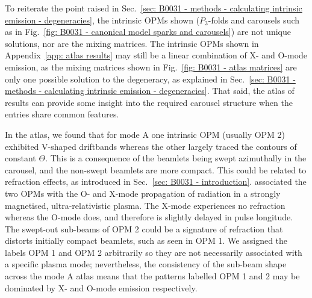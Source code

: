 To reiterate the point raised in Sec.~\ref{sec: B0031 - methods - calculating intrinsic emission - degeneracies}, the intrinsic OPMs shown ($P_3$-folds and carousels such as in Fig.~\ref{fig: B0031 - canonical model sparks and carousels}) are not unique solutions, nor are the mixing matrices. The intrinsic OPMs shown in Appendix~\ref{app: atlas results} may still be a linear combination of X- and O-mode emission, as the mixing matrices shown in Fig.~\ref{fig: B0031 - atlas matrices} are only one possible solution to the degeneracy, as explained in Sec.~\ref{sec: B0031 - methods - calculating intrinsic emission - degeneracies}. That said, the atlas of results can provide some insight into the required carousel structure when the entries share common features. 

In the atlas, we found that for mode A one intrinsic OPM (usually OPM 2) exhibited V-shaped driftbands whereas the other largely traced the contours of constant $\Theta$. This is a consequence of the beamlets being swept azimuthally in the carousel, and the non-swept beamlets are more compact. This could be related to refraction effects, as introduced in Sec.~\ref{sec: B0031 - introduction}. \citet{BAxx1986} associated the two OPMs with the O- and X-mode propagation of radiation in a strongly magnetised, ultra-relativistic plasma. The X-mode experiences no refraction whereas the O-mode does, and therefore is slightly delayed in pulse longitude. The swept-out sub-beams of OPM 2 could be a signature of refraction that distorts initially compact beamlets, such as seen in OPM 1. We assigned the labels OPM 1 and OPM 2 arbitrarily so they are not necessarily associated with a specific plasma mode; nevertheless, the consistency of the sub-beam shape across the mode A atlas means that the patterns labelled OPM 1 and 2 may be dominated by X- and O-mode emission respectively.

